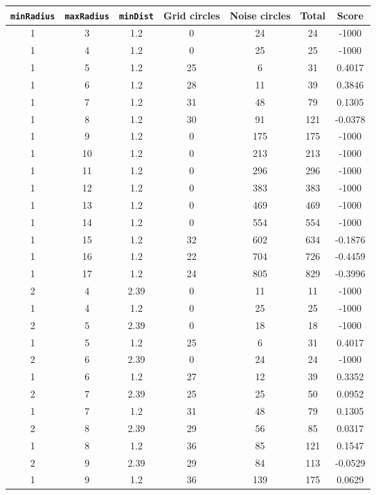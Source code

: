 \documentclass[letterpaper, 12pt]{article}
\begin{document}
\begin{longtable}{|c|c|c|c|c|c|c|}
\hline
\textbf{\texttt{minRadius}} & \textbf{\texttt{maxRadius}} & \textbf{\texttt{minDist}} & \textbf{Grid circles} & \textbf{Noise circles} & \textbf{Total} & \textbf{Score} \\
\hline
1 & 3 & 1.2 & 0 & 24 & 24 & -1000 \\
\hline
1 & 4 & 1.2 & 0 & 25 & 25 & -1000 \\
\hline
1 & 5 & 1.2 & 25 & 6 & 31 & 0.4017 \\
\hline
1 & 6 & 1.2 & 28 & 11 & 39 & 0.3846 \\
\hline
1 & 7 & 1.2 & 31 & 48 & 79 & 0.1305 \\
\hline
1 & 8 & 1.2 & 30 & 91 & 121 & -0.0378 \\
\hline
1 & 9 & 1.2 & 0 & 175 & 175 & -1000 \\
\hline
1 & 10 & 1.2 & 0 & 213 & 213 & -1000 \\
\hline
1 & 11 & 1.2 & 0 & 296 & 296 & -1000 \\
\hline
1 & 12 & 1.2 & 0 & 383 & 383 & -1000 \\
\hline
1 & 13 & 1.2 & 0 & 469 & 469 & -1000 \\
\hline
1 & 14 & 1.2 & 0 & 554 & 554 & -1000 \\
\hline
1 & 15 & 1.2 & 32 & 602 & 634 & -0.1876 \\
\hline
1 & 16 & 1.2 & 22 & 704 & 726 & -0.4459 \\
\hline
1 & 17 & 1.2 & 24 & 805 & 829 & -0.3996 \\
\hline
2 & 4 & 2.39 & 0 & 11 & 11 & -1000 \\
\hline
1 & 4 & 1.2 & 0 & 25 & 25 & -1000 \\
\hline
2 & 5 & 2.39 & 0 & 18 & 18 & -1000 \\
\hline
1 & 5 & 1.2 & 25 & 6 & 31 & 0.4017 \\
\hline
2 & 6 & 2.39 & 0 & 24 & 24 & -1000 \\
\hline
1 & 6 & 1.2 & 27 & 12 & 39 & 0.3352 \\
\hline
2 & 7 & 2.39 & 25 & 25 & 50 & 0.0952 \\
\hline
1 & 7 & 1.2 & 31 & 48 & 79 & 0.1305 \\
\hline
2 & 8 & 2.39 & 29 & 56 & 85 & 0.0317 \\
\hline
1 & 8 & 1.2 & 36 & 85 & 121 & 0.1547 \\
\hline
2 & 9 & 2.39 & 29 & 84 & 113 & -0.0529 \\
\hline
1 & 9 & 1.2 & 36 & 139 & 175 & 0.0629 \\

\end{longtable}
\end{document}
